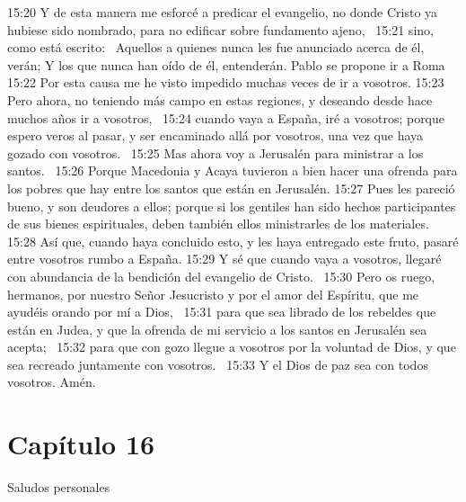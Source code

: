 15:20 Y de esta manera me esforcé a predicar el evangelio, no donde Cristo ya hubiese sido nombrado, para no edificar sobre fundamento ajeno,  
15:21 sino, como está escrito:  
Aquellos a quienes nunca les fue anunciado acerca de él, verán; Y los que nunca han oído de él, entenderán. 
Pablo se propone ir a Roma  
15:22 Por esta causa me he visto impedido muchas veces de ir a vosotros. 
15:23 Pero ahora, no teniendo más campo en estas regiones, y deseando desde hace muchos años ir a vosotros,  
15:24 cuando vaya a España, iré a vosotros; porque espero veros al pasar, y ser encaminado allá por vosotros, una vez que haya gozado con vosotros.  
15:25 Mas ahora voy a Jerusalén para ministrar a los santos.  
15:26 Porque Macedonia y Acaya tuvieron a bien hacer una ofrenda para los pobres que hay entre los santos que están en Jerusalén. 
15:27 Pues les pareció bueno, y son deudores a ellos; porque si los gentiles han sido hechos participantes de sus bienes espirituales, deben también ellos ministrarles de los materiales. 
15:28 Así que, cuando haya concluido esto, y les haya entregado este fruto, pasaré entre vosotros rumbo a España. 
15:29 Y sé que cuando vaya a vosotros, llegaré con abundancia de la bendición del evangelio de Cristo.  
15:30 Pero os ruego, hermanos, por nuestro Señor Jesucristo y por el amor del Espíritu, que me ayudéis orando por mí a Dios,  
15:31 para que sea librado de los rebeldes que están en Judea, y que la ofrenda de mi servicio a los santos en Jerusalén sea acepta;  
15:32 para que con gozo llegue a vosotros por la voluntad de Dios, y que sea recreado juntamente con vosotros.  
15:33 Y el Dios de paz sea con todos vosotros. Amén.  
\section*{Capítulo 16}
Saludos personales  

